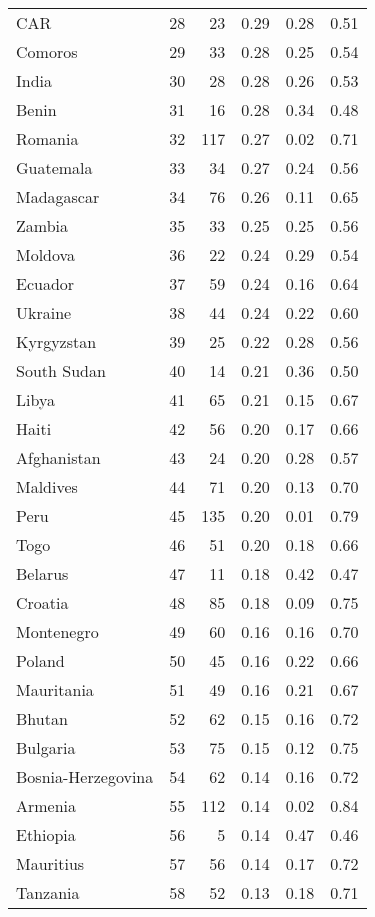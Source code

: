 \begin{longtable}[t]{lrrrrr}
CAR & 28 & 23 & 0.29 & 0.28 & 0.51\\
Comoros & 29 & 33 & 0.28 & 0.25 & 0.54\\
India & 30 & 28 & 0.28 & 0.26 & 0.53\\
\addlinespace
Benin & 31 & 16 & 0.28 & 0.34 & 0.48\\
Romania & 32 & 117 & 0.27 & 0.02 & 0.71\\
Guatemala & 33 & 34 & 0.27 & 0.24 & 0.56\\
Madagascar & 34 & 76 & 0.26 & 0.11 & 0.65\\
Zambia & 35 & 33 & 0.25 & 0.25 & 0.56\\
\addlinespace
Moldova & 36 & 22 & 0.24 & 0.29 & 0.54\\
Ecuador & 37 & 59 & 0.24 & 0.16 & 0.64\\
Ukraine & 38 & 44 & 0.24 & 0.22 & 0.60\\
Kyrgyzstan & 39 & 25 & 0.22 & 0.28 & 0.56\\
South Sudan & 40 & 14 & 0.21 & 0.36 & 0.50\\
\addlinespace
Libya & 41 & 65 & 0.21 & 0.15 & 0.67\\
Haiti & 42 & 56 & 0.20 & 0.17 & 0.66\\
Afghanistan & 43 & 24 & 0.20 & 0.28 & 0.57\\
Maldives & 44 & 71 & 0.20 & 0.13 & 0.70\\
Peru & 45 & 135 & 0.20 & 0.01 & 0.79\\
\addlinespace
Togo & 46 & 51 & 0.20 & 0.18 & 0.66\\
Belarus & 47 & 11 & 0.18 & 0.42 & 0.47\\
Croatia & 48 & 85 & 0.18 & 0.09 & 0.75\\
Montenegro & 49 & 60 & 0.16 & 0.16 & 0.70\\
Poland & 50 & 45 & 0.16 & 0.22 & 0.66\\
\addlinespace
Mauritania & 51 & 49 & 0.16 & 0.21 & 0.67\\
Bhutan & 52 & 62 & 0.15 & 0.16 & 0.72\\
Bulgaria & 53 & 75 & 0.15 & 0.12 & 0.75\\
Bosnia-Herzegovina & 54 & 62 & 0.14 & 0.16 & 0.72\\
Armenia & 55 & 112 & 0.14 & 0.02 & 0.84\\
\addlinespace
Ethiopia & 56 & 5 & 0.14 & 0.47 & 0.46\\
Mauritius & 57 & 56 & 0.14 & 0.17 & 0.72\\
Tanzania & 58 & 52 & 0.13 & 0.18 & 0.71\\

\end{longtable}
